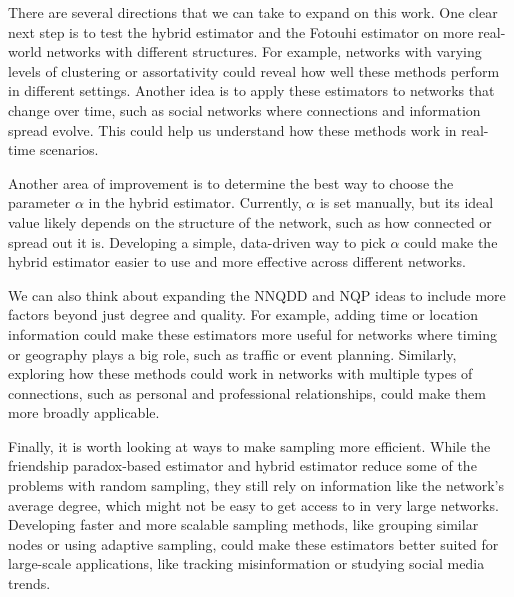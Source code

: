 \documentclass{article}
\begin{document}
There are several directions that we can take to expand on this work. One clear next step is to test the hybrid estimator and the Fotouhi estimator on more real-world networks with different structures. For example, networks with varying levels of clustering or assortativity could reveal how well these methods perform in different settings. Another idea is to apply these estimators to networks that change over time, such as social networks where connections and information spread evolve. This could help us understand how these methods work in real-time scenarios.

Another area of improvement is to determine the best way to choose the parameter \( \alpha \) in the hybrid estimator. Currently, \( \alpha \) is set manually, but its ideal value likely depends on the structure of the network, such as how connected or spread out it is. Developing a simple, data-driven way to pick \( \alpha \) could make the hybrid estimator easier to use and more effective across different networks.

We can also think about expanding the NNQDD and NQP ideas to include more factors beyond just degree and quality. For example, adding time or location information could make these estimators more useful for networks where timing or geography plays a big role, such as traffic or event planning. Similarly, exploring how these methods could work in networks with multiple types of connections, such as personal and professional relationships, could make them more broadly applicable.

Finally, it is worth looking at ways to make sampling more efficient. While the friendship paradox-based estimator and hybrid estimator reduce some of the problems with random sampling, they still rely on information like the network’s average degree, which might not be easy to get access to in very large networks. Developing faster and more scalable sampling methods, like grouping similar nodes or using adaptive sampling, could make these estimators better suited for large-scale applications, like tracking misinformation or studying social media trends.

\nocite{*}
\printbibliography
\end{document}
